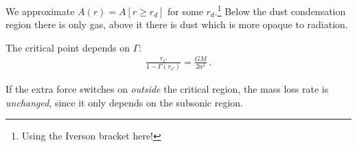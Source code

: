 \documentclass[main.tex]{subfiles}
\begin{document}
We approximate \(A(r) = A [r \geq r_d]\) for some \(r_d\).\footnote{Using the Iverson bracket here!}
Below the dust condensation region there is only gas, above it there is dust which is more opaque to radiation.

The critical point depends on \(\Gamma \): 
%
\begin{align}
  \frac{r_C}{1 - \Gamma (r_C)} = \frac{GM}{2 a^2}
\,.
\end{align}
%

If the extra force switches on \emph{outside} the critical region, the mass loss rate is \emph{unchanged}, since it only depends on the subsonic region.

\end{document}
